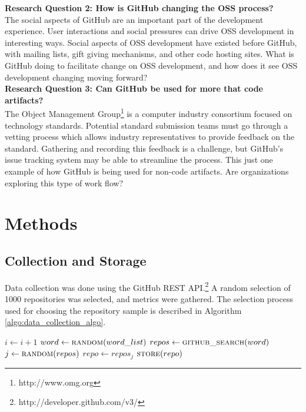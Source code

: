 \documentclass{proc}
\begin{document}
\noindent \textbf{Research Question 2: How is GitHub changing the OSS process?}\\
The social aspects of GitHub are an important part of the development experience\cite{dabbish2012social}. User interactions and social pressures can drive OSS development in interesting ways. Social aspects of OSS development have existed before GitHub, with mailing lists\cite{mockus2000case}, gift giving mechanisms\cite{bergquist2008power}, and other code hosting sites. What is GitHub doing to facilitate change on OSS development, and how does it see OSS development changing moving forward?\\

\noindent \textbf{Research Question 3: Can GitHub be used for more that code artifacts?}\\
The Object Management Group\textsuperscript{\textregistered}\footnote{http://www.omg.org} is a computer industry consortium focused on technology standards. Potential standard submission teams must go through a vetting process\cite{kobryn1999uml} which allows industry representatives to provide feedback on the standard. Gathering and recording this feedback is a challenge, but GitHub's issue tracking system may be able to streamline the process. This just one example of how GitHub is being used for non-code artifacts. Are organizations exploring this type of work flow?

\section{Methods}
\subsection{Collection and Storage}
Data collection was done using the GitHub REST API.\footnote{http://developer.github.com/v3/} A random selection of 1000 repositories was selected, and metrics were gathered. The selection process used for choosing the repository sample is described in Algorithm \ref{algo:data_collection_algo}.

\begin{algorithm}[H]
\label{algo:data_collection_algo}
\begin{algorithmic}[1]
\State $i \gets i + 1$
\State $word \gets \textsc{random}(word\_list)$
\State $repos \gets \textsc{github\_search}(word)$
\State $j \gets \textsc{random}(repos)$
\State $repo \gets repos_j$
\State $\textsc{store}(repo)$
\EndIf 
\EndWhile
\end{algorithmic}
\end{algorithm}
\end{document}
